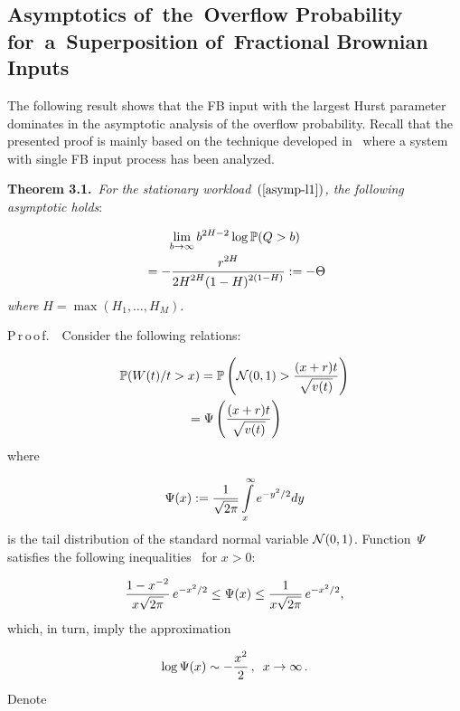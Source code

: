 \begin{multicols}{2}
\vspace*{-6pt}

\section{Asymptotics of~the~Overflow Probability for~a~Superposition of~Fractional
Brownian Inputs}

\noindent
The following result shows that the  FB input  with the largest
Hurst parameter dominates in the asymptotic analysis of the overflow
probability. Recall that the  presented proof is mainly based on
the technique developed in~\cite{Duffield} where
a  system with  single FB input process has been  analyzed.

\smallskip

\noindent
\textbf{Theorem 3.1.}\
\textit{For the  stationary workload~$(\ref{asymp-l1})$, the following
asymptotic holds}:

\noindent
\begin{multline*}
\lim_{b \to \infty}b^{2H-2}\log \mathbb{P} (Q>b)\\
{}=-\displaystyle\frac{\displaystyle r^{2H}\mathstrut}{\displaystyle  2H^{2H}(1-H)^{2(1-H)} \mathstrut}:=-\Theta
\end{multline*}
\textit{where} $H=\max(H_1,\ldots ,H_M).$

\smallskip

\noindent
P\,r\,o\,o\,f.\ \ Consider the following  relations:

\noindent
\begin{multline}
\mathbb{P}(W(t)/t>x)=\mathbb{P}\left(\mathcal{N}(0,1)>
\displaystyle\frac{\displaystyle (x+r)t\mathstrut}{\displaystyle \sqrt{v(t)}\mathstrut} \right)\\
{}=\Psi\left( \displaystyle\frac{\displaystyle (x+r)t\mathstrut}{\displaystyle \sqrt{v(t)}\mathstrut} \right)
\label{ar-l2}
\end{multline}
where

\noindent
$$
\Psi(x):=\displaystyle\frac{\displaystyle 1\mathstrut}{\displaystyle \sqrt{2\pi}\mathstrut}\int\limits_x^\infty e^{-y^2/2}dy
$$
is the tail distribution of the standard normal variable
$\mathcal{N}(0,1)$.   Function~$\Psi$ satisfies   the following
inequalities~\cite{Mandjes} for   $x>0$:

\noindent
\begin{equation*}
\displaystyle\frac{\displaystyle 1-x^{-2}\mathstrut}{\displaystyle x\sqrt{2\pi}\mathstrut}\, e^{-{x^2}/2} \le \Psi(x) \le
\displaystyle\frac{\displaystyle 1\mathstrut}{\displaystyle x\sqrt{2\pi}\mathstrut}\, e^{-x^2/2},
\end{equation*}
which, in turn, imply  the approximation

\noindent
\begin{equation}
\log \Psi(x) \sim -\displaystyle\frac{\displaystyle x^2\mathstrut}{\displaystyle 2\mathstrut}\,,\enskip x \to \infty\,.
\label{ar-l1}
\end{equation}
Denote


\end{multicols}
